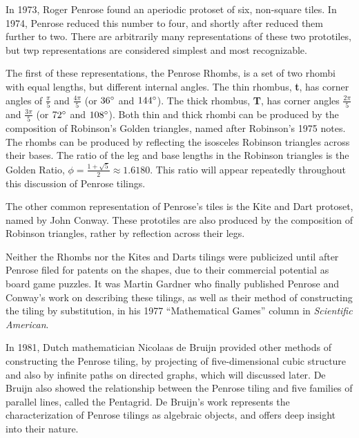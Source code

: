 \documentclass[]{article}
\begin{document}
In 1973, Roger Penrose found an aperiodic protoset of six, non-square tiles. In 1974, Penrose reduced this number to four, and shortly after reduced them further to two. There are arbitrarily many representations of these two prototiles, but twp representations are considered simplest and most recognizable. 

The first of these representations, the Penrose Rhombs, is a set of two rhombi with equal lengths, but different internal angles. The thin rhombus, \textbf{t}, has corner angles of $\frac{\pi}{5}$ and $\frac{4 \pi}{5}$ (or $36 \degree$ and $144 \degree$). The thick rhombus, \textbf{T}, has corner angles  $\frac{2 \pi}{5}$ and $\frac{3 \pi}{5}$ (or $72 \degree$ and $108 \degree$). Both thin and thick rhombi can be produced by the composition of Robinson's Golden triangles, named after Robinson's 1975 notes. The rhombs can be produced by reflecting the isosceles Robinson triangles across their bases. The ratio of the leg and base lengths in the Robinson triangles is the Golden Ratio, \textbf{ $\phi= \frac{1+\sqrt{5}}{2}\approx 1.6180$}. This ratio will appear repeatedly throughout this discussion of Penrose tilings. 

The other common representation of Penrose's tiles is the Kite and Dart protoset, named by John Conway. These prototiles are also produced by the composition of Robinson triangles, rather by reflection across their legs. 

Neither the Rhombs nor the Kites and Darts tilings were publicized until after Penrose filed for patents on the shapes, due to their commercial potential as board game puzzles. It was Martin Gardner who finally published Penrose and Conway's work on describing these tilings, as well as their method of constructing the tiling by substitution, in his 1977 ``Mathematical Games'' column in \textit{Scientific American}. 

In 1981, Dutch mathematician Nicolaas de Bruijn provided other methods of constructing the Penrose tiling, by projecting of five-dimensional cubic structure and also by infinite paths on directed graphs, which will discussed later. De Bruijn also showed the relationship between the Penrose tiling and five families of parallel lines, called the Pentagrid. De Bruijn's work represents the characterization of Penrose tilings as algebraic objects, and offers deep insight into their nature. 
\end{document}
